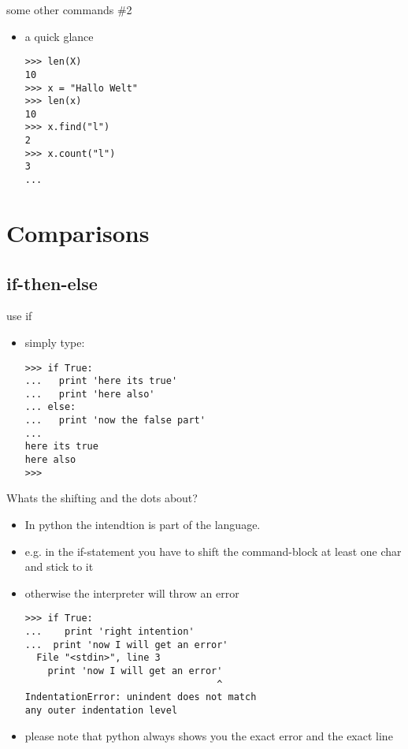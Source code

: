 \documentclass[hyperref={pdfpagelabels=false}]{beamer}
\begin{document}
		\begin{frame}[fragile]{some other commands \#2}
			\begin{itemize}
                \item<1-> a quick glance 
\begin{lstlisting}
>>> len(X)
10
>>> x = "Hallo Welt"
>>> len(x)
10
>>> x.find("l")
2
>>> x.count("l")
3
...
\end{lstlisting}
            \end{itemize}
		\end{frame}
\section{Comparisons}
    \subsection{if-then-else}
		\begin{frame}[fragile]{use if}
			\begin{itemize}
                \item<1-> simply type:
\begin{lstlisting}
>>> if True:
...   print 'here its true'
...   print 'here also'
... else:
...   print 'now the false part'
... 
here its true
here also
>>>
\end{lstlisting}
            \end{itemize}
		\end{frame}
        \begin{frame}[fragile]{Whats the shifting and the dots about?}
			\begin{itemize}
                \item<1-> In python the intendtion is part of the language.
                \item<2-> e.g. in the if-statement you have to shift the command-block at least one char and stick to it
                \item<3-> otherwise the interpreter will throw an error
                    \begin{lstlisting}
>>> if True:
...    print 'right intention'
...  print 'now I will get an error'
  File "<stdin>", line 3
    print 'now I will get an error'
                                  ^
IndentationError: unindent does not match
any outer indentation level
\end{lstlisting}
                \item<4-> please note that python always shows you the exact error and the exact line
            \end{itemize}
		\end{frame}
\end{document}
